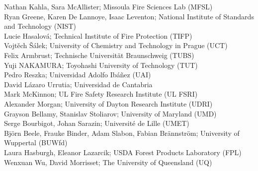 \documentclass{book}
\begin{document}
\begin{minipage}[b]{0.7\textwidth}
\begin{flushright}
			Nathan Kahla, Sara McAllister; Missoula Fire Sciences Lab (MFSL) \\
			Ryan Greene, Karen De Lannoye, Isaac Leventon; National Institute of Standards and Technology (NIST) \\
			Lucie Hasalová; Technical Institute of Fire Protection (TIFP) \\
			Vojtěch Šálek; University of Chemistry and Technology in Prague (UCT) \\
			Felix Armbrust; Technische Universität Braunschweig (TUBS)\\
			Yuji NAKAMURA; Toyohashi University of Technology (TUT)\\
			Pedro Reszka; Universidad Adolfo Ibáñez (UAI) \\
			David Lázaro Urrutia; Universidad de Cantabria \\
			Mark McKinnon; UL Fire Safety Research Institute (UL FSRI) \\
			Alexander Morgan; University of Dayton Research Institute (UDRI) \\
			Grayson Bellamy, Stanislav Stoliarov; University of Maryland (UMD) \\
			Serge Bourbigot, Johan Sarazin; Université de Lille (UMET) \\
			Björn Beele, Frauke Binder, Adam Slabon, Fabian Brännström; University of Wuppertal (BUWfd)\\
			Laura Hasburgh, Eleanor Lazarcik; USDA Forest Products Laboratory (FPL)\\
			Wenxuan Wu, David Morrisset; The University of Queensland (UQ) \\
			\normalsize
			
			
		\end{flushright}
	\end{minipage}
	
\end{document}
